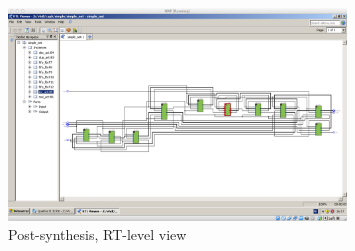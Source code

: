 \begin{figure}[htbp]
  \centering
 \includegraphics[angle=90,width=0.8\textwidth]{./figs/simple-quartus-7.pdf}
  \caption{Post-synthesis, RT-level view}
  \label{fig:simple-quartus-7}
\end{figure}

